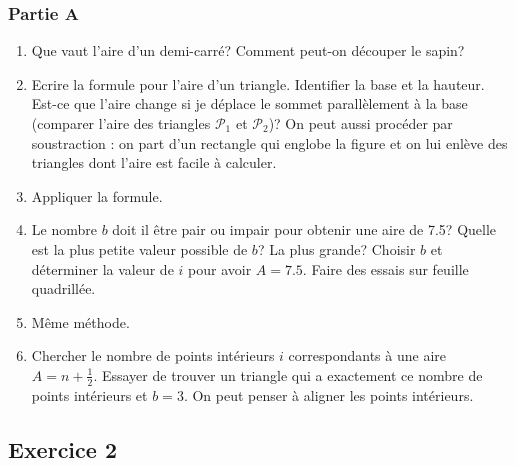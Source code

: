 \documentclass[a4paper,12pt, noSujetB]{article}
\begin{document}
\subsubsection*{Partie A}
\begin{enumerate}
    \item Que vaut l'aire d'un demi-carré? Comment peut-on découper le sapin?
    \item Ecrire la formule pour l'aire d'un triangle. Identifier la base et la hauteur. Est-ce que l'aire change si je déplace le sommet parallèlement à la base (comparer l'aire des triangles $\mathcal{P}_1$ et $\mathcal{P}_2$)? On peut aussi procéder par soustraction : on part d'un rectangle qui englobe la figure et on lui enlève des triangles dont l'aire est facile à calculer.
    \item Appliquer la formule.
    \item Le nombre $b$ doit il être pair ou impair pour obtenir une aire de 7.5? Quelle est la plus petite valeur possible de $b$? La plus grande? Choisir $b$ et déterminer la valeur de $i$ pour avoir $A=7.5$. Faire des essais sur feuille quadrillée.
    \item Même méthode.
    \item Chercher le nombre de points intérieurs $i$ correspondants à une aire $A=n+\frac{1}{2}$. Essayer de trouver un triangle qui a exactement ce nombre de points intérieurs et $b=3$. On peut penser à aligner les points intérieurs.
\end{enumerate}

\subsection*{Exercice 2}
\end{document}
